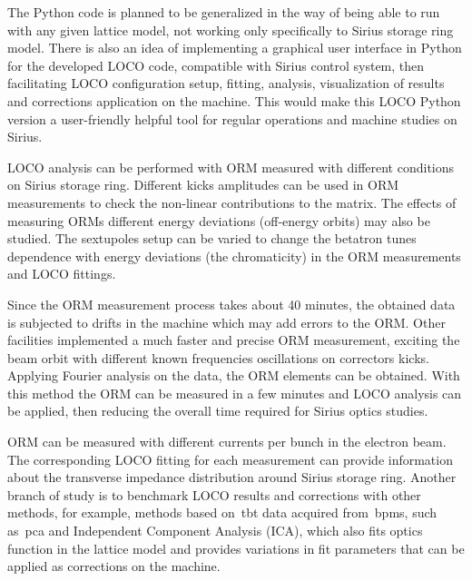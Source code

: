 The Python code is planned to be generalized in the way of being able to run with any given lattice model, not working only specifically to Sirius storage ring model. There is also an idea of implementing a graphical user interface in Python for the developed LOCO code, compatible with Sirius control system, then facilitating LOCO configuration setup, fitting, analysis, visualization of results and corrections application on the machine. This would make this LOCO Python version a user-friendly helpful tool for regular operations and machine studies on Sirius. 

LOCO analysis can be performed with ORM measured with different conditions on Sirius storage ring. Different kicks amplitudes can be used in ORM measurements to check the non-linear contributions to the matrix. The effects of measuring ORMs different energy deviations (off-energy orbits) may also be studied. The sextupoles setup can be varied to change the betatron tunes dependence with energy deviations (the chromaticity) in the ORM measurements and LOCO fittings.

Since the ORM measurement process takes about 40 minutes, the obtained data is subjected to drifts in the machine which may add errors to the ORM. Other facilities implemented a much faster and precise ORM measurement, exciting the beam orbit with different known frequencies oscillations on correctors kicks. Applying Fourier analysis on the data, the ORM elements can be obtained. With this method the ORM can be measured in a few minutes and LOCO analysis can be applied, then reducing the overall time required for Sirius optics studies.

ORM can be measured with different currents per bunch in the electron beam. The corresponding LOCO fitting for each measurement can provide information about the transverse impedance distribution around Sirius storage ring.  
Another branch of study is to benchmark LOCO results and corrections with other methods, for example, methods based on~\gls{tbt} data acquired from~\glspl{bpm}, such as~\gls{pca} and Independent Component Analysis (ICA), which also fits optics function in the lattice model and provides variations in fit parameters that can be applied as corrections on the machine.